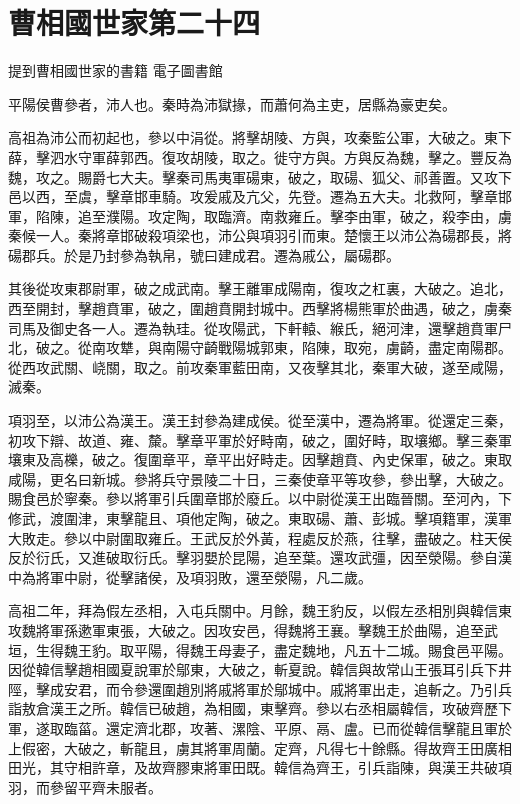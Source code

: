 \chapter{曹相國世家第二十四}

提到曹相國世家的書籍 電子圖書館

平陽侯曹參者，沛人也。秦時為沛獄掾，而蕭何為主吏，居縣為豪吏矣。

高祖為沛公而初起也，參以中涓從。將擊胡陵、方與，攻秦監公軍，大破之。東下薛，擊泗水守軍薛郭西。復攻胡陵，取之。徙守方與。方與反為魏，擊之。豐反為魏，攻之。賜爵七大夫。擊秦司馬夷軍碭東，破之，取碭、狐父、祁善置。又攻下邑以西，至虞，擊章邯車騎。攻爰戚及亢父，先登。遷為五大夫。北救阿，擊章邯軍，陷陳，追至濮陽。攻定陶，取臨濟。南救雍丘。擊李由軍，破之，殺李由，虜秦候一人。秦將章邯破殺項梁也，沛公與項羽引而東。楚懷王以沛公為碭郡長，將碭郡兵。於是乃封參為執帛，號曰建成君。遷為戚公，屬碭郡。

其後從攻東郡尉軍，破之成武南。擊王離軍成陽南，復攻之杠裏，大破之。追北，西至開封，擊趙賁軍，破之，圍趙賁開封城中。西擊將楊熊軍於曲遇，破之，虜秦司馬及御史各一人。遷為執珪。從攻陽武，下軒轅、緱氏，絕河津，還擊趙賁軍尸北，破之。從南攻犨，與南陽守齮戰陽城郭東，陷陳，取宛，虜齮，盡定南陽郡。從西攻武關、峣關，取之。前攻秦軍藍田南，又夜擊其北，秦軍大破，遂至咸陽，滅秦。

項羽至，以沛公為漢王。漢王封參為建成侯。從至漢中，遷為將軍。從還定三秦，初攻下辯、故道、雍、斄。擊章平軍於好畤南，破之，圍好畤，取壤鄉。擊三秦軍壤東及高櫟，破之。復圍章平，章平出好畤走。因擊趙賁、內史保軍，破之。東取咸陽，更名曰新城。參將兵守景陵二十日，三秦使章平等攻參，參出擊，大破之。賜食邑於寧秦。參以將軍引兵圍章邯於廢丘。以中尉從漢王出臨晉關。至河內，下修武，渡圍津，東擊龍且、項他定陶，破之。東取碭、蕭、彭城。擊項籍軍，漢軍大敗走。參以中尉圍取雍丘。王武反於外黃，程處反於燕，往擊，盡破之。柱天侯反於衍氏，又進破取衍氏。擊羽嬰於昆陽，追至葉。還攻武彊，因至滎陽。參自漢中為將軍中尉，從擊諸侯，及項羽敗，還至滎陽，凡二歲。

高祖二年，拜為假左丞相，入屯兵關中。月餘，魏王豹反，以假左丞相別與韓信東攻魏將軍孫遬軍東張，大破之。因攻安邑，得魏將王襄。擊魏王於曲陽，追至武垣，生得魏王豹。取平陽，得魏王母妻子，盡定魏地，凡五十二城。賜食邑平陽。因從韓信擊趙相國夏說軍於鄔東，大破之，斬夏說。韓信與故常山王張耳引兵下井陘，擊成安君，而令參還圍趙別將戚將軍於鄔城中。戚將軍出走，追斬之。乃引兵詣敖倉漢王之所。韓信已破趙，為相國，東擊齊。參以右丞相屬韓信，攻破齊歷下軍，遂取臨菑。還定濟北郡，攻著、漯陰、平原、鬲、盧。已而從韓信擊龍且軍於上假密，大破之，斬龍且，虜其將軍周蘭。定齊，凡得七十餘縣。得故齊王田廣相田光，其守相許章，及故齊膠東將軍田既。韓信為齊王，引兵詣陳，與漢王共破項羽，而參留平齊未服者。

